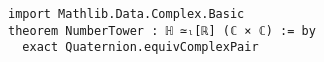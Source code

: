 \begin{lstlisting}[language=Lean]
import Mathlib.Data.Complex.Basic
theorem NumberTower : ℍ ≃ₗ[ℝ] (ℂ × ℂ) := by
  exact Quaternion.equivComplexPair 
\end{lstlisting}
